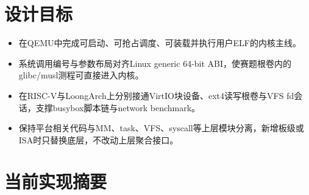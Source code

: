 \section{设计目标}

\begin{itemize}
  \item 在QEMU中完成可启动、可抢占调度、可装载并执行用户ELF的内核主线。
  \item 系统调用编号与参数布局对齐Linux generic 64-bit ABI，使赛题根卷内的glibc/musl测程可直接进入内核。
  \item 在RISC-V与LoongArch上分别接通VirtIO块设备、ext4读写根卷与VFS fd会话，支撑busybox脚本链与network benchmark。
  \item 保持平台相关代码与MM、task、VFS、syscall等上层模块分离，新增板级或ISA时只替换底层，不改动上层聚合接口。
\end{itemize}


\section{当前实现摘要}

